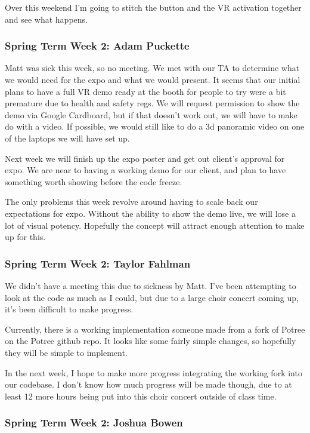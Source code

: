 \documentclass[draftclsnofoot,onecolumn]{IEEEtran}
\begin{document}
Over this weekend I'm going to stitch the button and the VR activation together and see what happens.

\subsubsection{Spring Term Week 2: Adam Puckette}

Matt was sick this week, so no meeting. We met with our TA to determine what we would need for the expo and what we would present. It seems that our initial plans to have a full VR demo ready at the booth for people to try were a bit premature due to health and safety regs. We will request permission to show the demo via Google Cardboard, but if that doesn't work out, we will have to make do with a video. If possible, we would still like to do a 3d panoramic video on one of the laptops we will have set up.

Next week we will finish up the expo poster and get out client's approval for expo. We are near to having a working demo for our client, and plan to have something worth showing before the code freeze.

The only problems this week revolve around having to scale back our expectations for expo. Without the ability to show the demo live, we will lose a lot of visual potency. Hopefully the concept will attract enough attention to make up for this.

\subsubsection{Spring Term Week 2: Taylor Fahlman}

We didn't have a meeting this due to sickness by Matt. I've been attempting to look at the code as much as I could, but due to a large choir concert coming up, it's been difficult to make progress.

Currently, there is a working implementation someone made from a fork of Potree on the Potree github repo. It looks like some fairly simple changes, so hopefully they will be simple to implement.

In the next week, I hope to make more progress integrating the working fork into our codebase. I don't know how much progress will be made though, due to at least 12 more hours being put into this choir concert outside of class time.

\subsubsection{Spring Term Week 2: Joshua Bowen}
\end{document}
